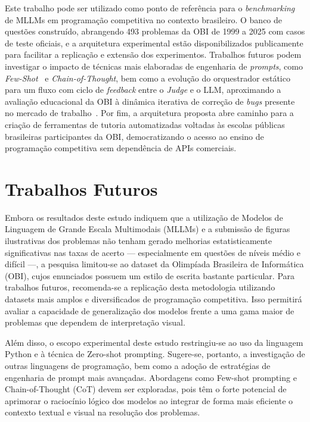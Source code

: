 \documentclass[sigconf,anonymous]{acmart} %
\begin{document}
Este trabalho pode ser utilizado como ponto de referência para o \textit{benchmarking} de MLLMs em programação competitiva no contexto brasileiro. O banco de questões construído, abrangendo 493 problemas da OBI de 1999 a 2025 com casos de teste oficiais, e a arquitetura experimental estão disponibilizados publicamente para facilitar a replicação e extensão dos experimentos. Trabalhos futuros podem investigar o impacto de técnicas mais elaboradas de engenharia de \textit{prompts}, como \textit{Few-Shot}~\cite{brown2020language} e \textit{Chain-of-Thought}, bem como a evolução do orquestrador estático para um fluxo com ciclo de \textit{feedback} entre o \textit{Judge} e o LLM, aproximando a avaliação educacional da OBI à dinâmica iterativa de correção de \textit{bugs} presente no mercado de trabalho~\cite{Silva2025LLMs}. Por fim, a arquitetura proposta abre caminho para a criação de ferramentas de tutoria automatizadas voltadas às escolas públicas brasileiras participantes da OBI, democratizando o acesso ao ensino de programação competitiva sem dependência de APIs comerciais.

\section{Trabalhos Futuros}

Embora os resultados deste estudo indiquem que a utilização de Modelos de Linguagem de Grande Escala Multimodais (MLLMs) e a submissão de figuras ilustrativas dos problemas não tenham gerado melhorias estatisticamente significativas nas taxas de acerto — especialmente em questões de níveis médio e difícil —, a pesquisa limitou-se ao dataset da Olimpíada Brasileira de Informática (OBI), cujos enunciados possuem um estilo de escrita bastante particular. Para trabalhos futuros, recomenda-se a replicação desta metodologia utilizando datasets mais amplos e diversificados de programação competitiva. Isso permitirá avaliar a capacidade de generalização dos modelos frente a uma gama maior de problemas que dependem de interpretação visual.

Além disso, o escopo experimental deste estudo restringiu-se ao uso da linguagem Python e à técnica de Zero-shot prompting. Sugere-se, portanto, a investigação de outras linguagens de programação, bem como a adoção de estratégias de engenharia de prompt mais avançadas. Abordagens como Few-shot prompting e Chain-of-Thought (CoT) devem ser exploradas, pois têm o forte potencial de aprimorar o raciocínio lógico dos modelos ao integrar de forma mais eficiente o contexto textual e visual na resolução dos problemas.
\end{document}
